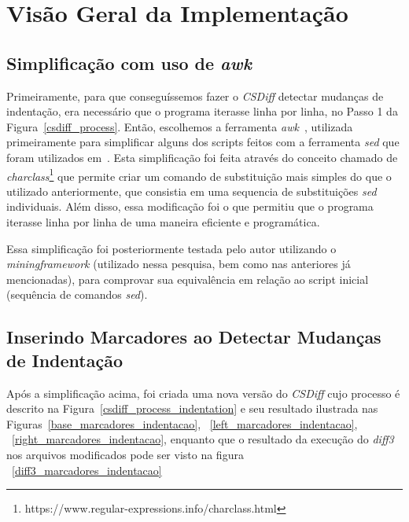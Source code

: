 \section{Visão Geral da Implementação}\label{implementacao}
\subsection{Simplificação com uso de \emph{awk}}

Primeiramente, para que conseguíssemos fazer o \emph{CSDiff} detectar mudanças
de indentação, era necessário que o programa iterasse linha por linha, no Passo
1 da Figura~\ref{csdiff_process}. Então, escolhemos a ferramenta
\emph{awk}~\cite{awk}, utilizada primeiramente para simplificar alguns dos
scripts feitos com a ferramenta \emph{sed} que foram utilizados
em~\cite{clem21,heitor21}. Esta simplificação foi feita através do conceito
chamado de
\emph{charclass}\footnote{https://www.regular-expressions.info/charclass.html}
que permite criar um comando de substituição mais simples do que o utilizado
anteriormente, que consistia em uma sequencia de substituições \emph{sed}
individuais. Além disso, essa modificação foi o que permitiu que o programa
iterasse linha por linha de uma maneira eficiente e programática.

Essa simplificação foi posteriormente testada pelo autor utilizando o
\emph{miningframework} (utilizado nessa pesquisa, bem como nas anteriores já
mencionadas), para comprovar sua equivalência em relação ao script inicial
(sequência de comandos \emph{sed}).

\subsection{Inserindo Marcadores ao Detectar Mudanças de Indentação}

Após a simplificação acima, foi criada uma nova versão do \emph{CSDiff} cujo
processo é descrito na Figura~\ref{csdiff_process_indentation} e seu resultado
ilustrada nas Figuras~\ref{base_marcadores_indentacao},
~\ref{left_marcadores_indentacao}, ~\ref{right_marcadores_indentacao}, enquanto
que o resultado da execução do \emph{diff3} nos arquivos modificados pode
ser visto na figura ~\ref{diff3_marcadores_indentacao}

